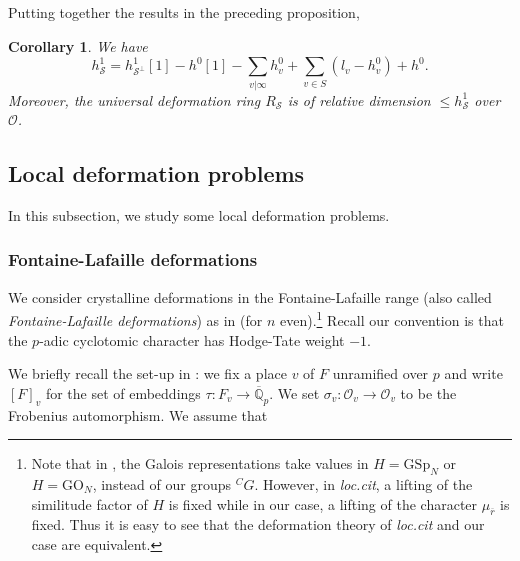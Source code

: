 \documentclass[12pt,oneside,reqno]{amsart}
\newcommand{\Q}{\mathbb{Q}}
\theoremstyle{plain}
\newtheorem{corollary}[theorem]{Corollary}
\begin{document}
	Putting together the results in the preceding
	proposition,
	\begin{corollary}\label{dimension of H^1}
		We have
		\[
		h^1_{\mathcal{S}}
		=
		h^1_{\mathcal{S}^\perp}[1]
		-
		h^0[1]
		-
		\sum_{v |\infty}h_v^0
		+
		\sum_{v\in S}
		(l_v
		-
		h_v^0
		)
		+
		h^0.
		\]
		Moreover,
		the universal deformation ring
		$R_\mathcal{S}$
		is of relative dimension
		$\leq h_{\mathcal{S}}^1$
		over
		$\mathcal{O}$.
	\end{corollary}
	
	
	\subsection{Local deformation problems}
	In this subsection,
	we study some local deformation problems.
	
	
	
	
	\subsubsection{Fontaine-Lafaille deformations}\label{Fontaine-Lafaille deformations}
	
	
	
	
	We consider crystalline deformations in the Fontaine-Lafaille range (also called \emph{Fontaine-Lafaille deformations}) as in \cite[Definition 5.1]{Booher2019} (for $n$ even).\footnote{Note that in \cite{Booher2019}, the Galois representations take values in $H=\mathrm{GSp}_N$ or $H=\mathrm{GO}_N$, instead of our groups $^CG$. However, in \emph{loc.cit}, a lifting of the similitude factor of $H$ is fixed while in our case, a lifting of the character $\mu_{\overline{r}}$ is fixed. Thus it is easy to see that the deformation theory of \emph{loc.cit} and our case are equivalent.} Recall our convention is that the $p$-adic cyclotomic character has Hodge-Tate weight $-1$.
	
	
	
	We briefly recall the set-up in \cite{Booher2019}: we fix a place $v$ of $F$ unramified over $p$ and write $[F]_v$ for the set of embeddings $\tau\colon F_v\to\overline{\Q}_p$. We set $\sigma_v\colon
	\mathcal{O}_v
	\rightarrow
	\mathcal{O}_v$
	to be the Frobenius automorphism. We assume that
	
\end{document}
